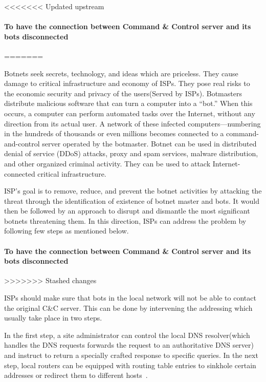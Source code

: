 

<<<<<<< Updated upstream
\paragraph{To have the connection between Command \& Control server and its bots disconnected}
=======

Botnets seek  secrets,  technology, and ideas which are priceless. They cause damage to critical infrastructure and economy of ISPs. They  pose real risks to the economic security and privacy of the users(Served by ISPs). Botmasters distribute malicious software that can turn a computer into a “bot.” When this occurs, a computer can perform automated tasks over the Internet, without any direction from its actual user. A network of these infected computers—numbering in the hundreds of thousands or even millions becomes connected to a command-and-control server operated by the botmaster. Botnet can be used in distributed denial of service (DDoS) attacks, proxy and spam services, malware distribution, and other organized criminal activity. They can be used to attack Internet-connected critical infrastructure. 


ISP's goal is to remove, reduce, and prevent the botnet activities by attacking the threat through the identification of existence of botnet  master and bots. It would then be followed by an approach to disrupt and dismantle the most significant botnets threatening them. In this direction, ISPs can address the problem by following few steps as mentioned below.  


\paragraph{ To have the connection between Command & Control server and its bots disconnected}
>>>>>>> Stashed changes

ISPs should make sure that bots in the local network will not be able to contact the original C\&C server.
This can be done by intervening the addressing which usually take place in two steps.

In the first step, a site administrator can control the local DNS resolver(which handles the DNS requests forwards the request to an authoritative DNS server) and instruct to return a specially crafted response to specific queries. In the next step, local routers can be equipped with routing table entries to sinkhole certain addresses or redirect them to different hosts~\cite{leder2009proactive}.


